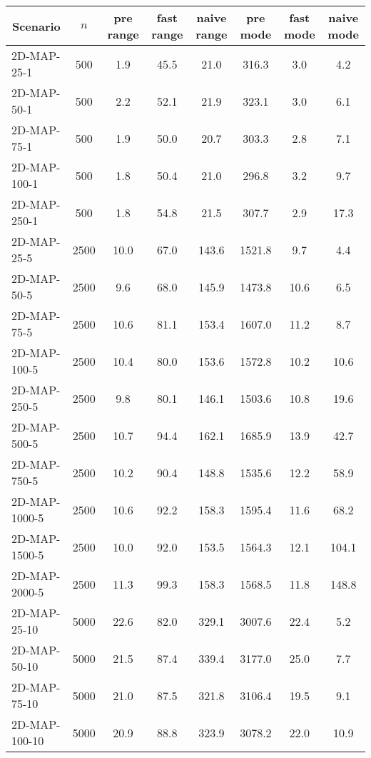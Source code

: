 \documentclass{article}
\begin{document}
    \begin{table}[h]
        \begin{center}    
        \begin{tabular}{|l||c|c|c|c|c|c|c|}
        \hline
        \multicolumn{1}{|c|}{Scenario} & $n$ & pre range & fast range & naive range & pre mode & fast mode & naive mode  \\
        \hline
        \hline
        2D-MAP-25-1 & 500 & 1.9 & 45.5 & 21.0 & 316.3 & 3.0 & 4.2 \\
        2D-MAP-50-1 & 500 & 2.2 & 52.1 & 21.9 & 323.1 & 3.0 & 6.1 \\
        2D-MAP-75-1 & 500 & 1.9 & 50.0 & 20.7 & 303.3 & 2.8 & 7.1 \\
        2D-MAP-100-1 & 500 & 1.8 & 50.4 & 21.0 & 296.8 & 3.2 & 9.7 \\
        2D-MAP-250-1 & 500 & 1.8 & 54.8 & 21.5 & 307.7 & 2.9 & 17.3 \\
        \hline
        2D-MAP-25-5 & 2500 & 10.0 & 67.0 & 143.6 & 1521.8 & 9.7 & 4.4 \\
        2D-MAP-50-5 & 2500 & 9.6 & 68.0 & 145.9 & 1473.8 & 10.6 & 6.5 \\
        2D-MAP-75-5 & 2500 & 10.6 & 81.1 & 153.4 & 1607.0 & 11.2 & 8.7 \\
        2D-MAP-100-5 & 2500 & 10.4 & 80.0 & 153.6 & 1572.8 & 10.2 & 10.6 \\
        2D-MAP-250-5 & 2500 & 9.8 & 80.1 & 146.1 & 1503.6 & 10.8 & 19.6 \\
        2D-MAP-500-5 & 2500 & 10.7 & 94.4 & 162.1 & 1685.9 & 13.9 & 42.7 \\
        2D-MAP-750-5 & 2500 & 10.2 & 90.4 & 148.8 & 1535.6 & 12.2 & 58.9 \\
        2D-MAP-1000-5 & 2500 & 10.6 & 92.2 & 158.3 & 1595.4 & 11.6 & 68.2 \\
        2D-MAP-1500-5 & 2500 & 10.0 & 92.0 & 153.5 & 1564.3 & 12.1 & 104.1 \\
        2D-MAP-2000-5 & 2500 & 11.3 & 99.3 & 158.3 & 1568.5 & 11.8 & 148.8 \\
        \hline
        2D-MAP-25-10 & 5000 & 22.6 & 82.0 & 329.1 & 3007.6 & 22.4 & 5.2 \\
        2D-MAP-50-10 & 5000 & 21.5 & 87.4 & 339.4 & 3177.0 & 25.0 & 7.7 \\
        2D-MAP-75-10 & 5000 & 21.0 & 87.5 & 321.8 & 3106.4 & 19.5 & 9.1 \\
        2D-MAP-100-10 & 5000 & 20.9 & 88.8 & 323.9 & 3078.2 & 22.0 & 10.9 \\

\end{tabular}
\end{center}
\end{table}
\end{document}
